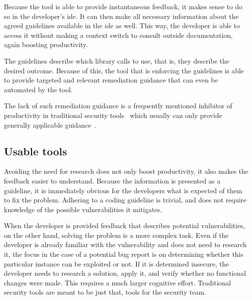 Because the tool is able to provide instantaneous feedback, it makes sense to do so in the developer's \gls{ide}.
It can then make all necessary information about the agreed guidelines available in the \gls{ide} as well.
This way, the developer is able to access it without making a context switch to consult outside documentation, again boosting productivity.

The guidelines describe which library calls to use, that is, they describe the desired outcome.
Because of this, the tool that is enforcing the guidelines is able to provide targeted and relevant remediation guidance that can even be automated by the tool.

The lack of such remediation guidance is a frequently mentioned inhibitor of productivity in traditional security tools~\cite{shiftleftsurvey} which usually can only provide generally applicable guidance~.

\subsection{Usable tools}
Avoiding the need for research does not only boost productivity, it also makes the feedback easier to understand.
Because the information is presented as a guideline, it is immediately obvious for the developers what is expected of them to fix the problem. Adhering to a coding guideline is trivial, and does not require knowledge of the possible vulnerabilities it mitigates.

When the developer is provided feedback that describes potential vulnerabilities, on the other hand, solving the problem is a more complex task. Even if the developer is already familiar with the \gls{vulnerability} and does not need to research it, the focus in the case of a potential bug report is on determining whether this particular instance can be exploited or not. If it is determined insecure, the developer needs to research a solution, apply it, and verify whether no functional changes were made. This requires a much larger cognitive effort. Traditional security tools are meant to be just that, tools for the security team.


